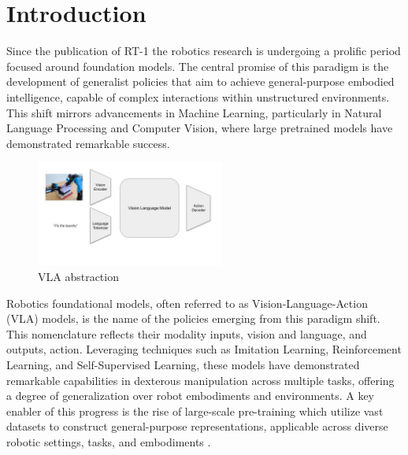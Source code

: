 \section{Introduction}


Since the publication of RT-1 \cite{RT-1} the robotics research is undergoing a prolific period focused around foundation models. The central promise of this paradigm is the development of generalist policies that aim to achieve general-purpose embodied intelligence, capable of complex interactions within unstructured environments. This shift mirrors advancements in Machine Learning, particularly in Natural Language Processing and Computer Vision, where large pretrained models have demonstrated remarkable success.

\begin{figure}
    \centering
    \includegraphics[width=0.55\textwidth]{images/vla.jpg}
    \caption{VLA abstraction}
    \label{fig:mesh}
\end{figure}


Robotics foundational models, often referred to as Vision-Language-Action (VLA) models, is the name of the policies emerging from this paradigm shift. This nomenclature reflects their modality inputs, vision and language, and outputs, action. Leveraging techniques such as Imitation Learning, Reinforcement Learning, and Self-Supervised Learning, these models have demonstrated remarkable capabilities in dexterous manipulation across multiple tasks, offering a degree of generalization over robot embodiments and environments. A key enabler of this progress is the rise of large-scale pre-training which utilize vast datasets to construct general-purpose representations, applicable across diverse robotic settings, tasks, and embodiments \cite{TransferWelle}.



